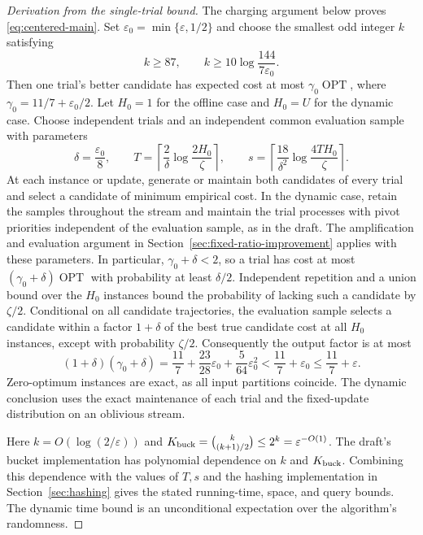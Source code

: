 \documentclass[11pt]{article}
\begin{document}
\begin{proof}[Derivation from the single-trial bound]
The charging argument below proves \eqref{eq:centered-main}.
Set $\varepsilon_0=\min\{\varepsilon,1/2\}$ and choose the smallest
odd integer $k$ satisfying
\[
 k\ge87,\qquad k\ge10\log\frac{144}{7\varepsilon_0}.
\]
Then one trial's better candidate has expected cost at most
$\gamma_0\operatorname{OPT}$, where
$\gamma_0=11/7+\varepsilon_0/2$.
Let $H_0=1$ for the offline case and $H_0=U$ for the dynamic case.
Choose independent trials and an independent common evaluation sample
with parameters
\[
 \delta=\frac{\varepsilon_0}{8},\qquad
 T=\left\lceil\frac{2}{\delta}\log\frac{2H_0}{\zeta}\right\rceil,
 \qquad
 s=\left\lceil\frac{18}{\delta^2}
                  \log\frac{4TH_0}{\zeta}\right\rceil.
\]
At each instance or update, generate or maintain both candidates of
every trial and select a candidate of minimum empirical cost.
In the dynamic case, retain the samples throughout the stream and
maintain the trial processes with pivot priorities independent of the
evaluation sample, as in the draft.
The amplification and evaluation argument in
Section~\ref{sec:fixed-ratio-improvement} applies with these parameters.
In particular, $\gamma_0+\delta<2$, so a trial has cost at most
$(\gamma_0+\delta)\operatorname{OPT}$ with probability at least
$\delta/2$. Independent repetition and a union bound over the $H_0$
instances bound the probability of lacking such a candidate by
$\zeta/2$. Conditional on all candidate trajectories, the evaluation
sample selects a candidate within a factor $1+\delta$ of the best
true candidate cost at all $H_0$ instances, except with probability
$\zeta/2$. Consequently the output factor is at most
\[
 (1+\delta)(\gamma_0+\delta)
 =\frac{11}{7}+\frac{23}{28}\varepsilon_0
                 +\frac{5}{64}\varepsilon_0^2
 <\frac{11}{7}+\varepsilon_0
 \le\frac{11}{7}+\varepsilon.
\]
Zero-optimum instances are exact, as all input partitions coincide.
The dynamic conclusion uses the exact maintenance of each trial and
the fixed-update distribution on an oblivious stream.

Here $k=O(\log(2/\varepsilon))$ and
$K_{\rm buck}=\binom{k}{(k+1)/2}\le2^k=\varepsilon^{-O(1)}$.
The draft's bucket implementation has polynomial dependence on $k$
and $K_{\rm buck}$. Combining this dependence with the values of
$T,s$ and the hashing implementation in Section~\ref{sec:hashing}
gives the stated running-time, space, and query bounds. The dynamic
time bound is an unconditional expectation over the algorithm's
randomness.
\end{proof}
\end{document}
